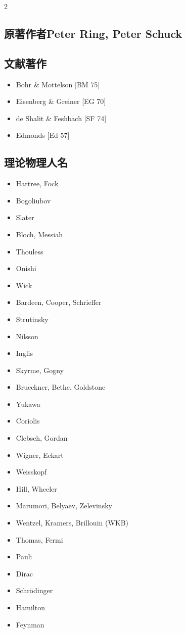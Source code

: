 \begin{multicols}{2}

\subsection*{原著作者Peter Ring, Peter Schuck}

\subsection*{文献著作}
\begin{itemize}
\item Bohr \& Mottelson {[}BM 75{]}
\item Eisenberg \& Greiner {[}EG 70{]}
\item de Shalit \& Feshbach {[}SF 74{]}
\item Edmonds {[}Ed 57{]}
\end{itemize}

\subsection*{理论物理人名}
\begin{itemize}
\item Hartree, Fock
\item Bogoliubov
\item Slater
\item Bloch, Messiah
\item Thouless
\item Onishi
\item Wick
\item Bardeen, Cooper, Schrieffer
\item Strutinsky
\item Nilsson
\item Inglis
\item Skyrme, Gogny
\item Brueckner, Bethe, Goldstone
\item Yukawa
\item Coriolis
\item Clebsch, Gordan
\item Wigner, Eckart
\item Weisskopf
\item Hill, Wheeler
\item Marumori, Belyaev, Zelevinsky
\item Wentzel, Kramers, Brillouin (WKB)
\item Thomas, Fermi
\item Pauli
\item Dirac
\item Schrödinger
\item Hamilton
\item Feynman
\end{itemize}
\end{multicols}
